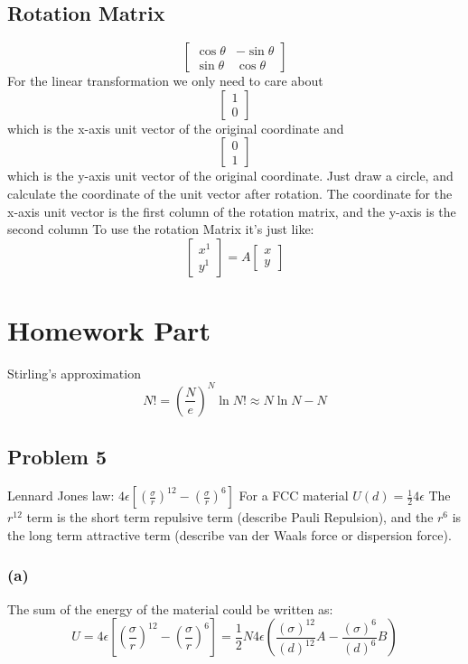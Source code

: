 \documentclass[a4paper]{article}
\begin{document}
\subsection{Rotation Matrix}
$$
\begin{bmatrix}
	{\cos\theta} & {-\sin\theta} \\
	{\sin\theta} & {\cos\theta}
\end{bmatrix}	
$$
For the linear transformation we only need to care about 
$$
\begin{bmatrix}
	1 \\
	0
\end{bmatrix}
$$
which is the x-axis unit vector of the original coordinate and
$$ 
\begin{bmatrix}
	0 \\
	1
\end{bmatrix}
$$
which is the y-axis unit vector of the original coordinate.
Just draw a circle, and calculate the coordinate of the unit vector after rotation. The coordinate for the x-axis unit vector is the first column of the rotation matrix, and the y-axis is the second column
\bigskip
To use the rotation Matrix it's just like:
$$
\begin{bmatrix}
	x^{1}\\
	y^{1}
\end{bmatrix}
=A
\begin{bmatrix}
	x\\
	y
\end{bmatrix}
$$

\bigskip
\section{Homework Part}
Stirling's approximation 
\begin{equation}
	N! = (\frac{N}{e})^{N}
	\ln N! \approx N\ln N- N
\end{equation}
\subsection{Problem 5}
Lennard Jones law: $4 \epsilon [(\frac{\sigma}{r})^{12}-(\frac{\sigma}{r})^{6}]$
For a FCC material $U(d)=\frac{1}{2} 4 \epsilon $
\newline
The $r^{12}$ term is the short term repulsive term (describe Pauli Repulsion), and the $r^{6}$ is the long term attractive term (describe van der Waals force or dispersion force).

\subsubsection{(a)}
The sum of the energy of the material could be written as: 
\begin{equation}
	U=4\epsilon [(\frac{\sigma}{r})^{12}-(\frac{\sigma}{r})^{6}]=\frac{1}{2}N 4\epsilon (\frac{(\sigma)^{12}}{(d)^{12}}A-\frac{(\sigma)^{6}}{(d)^{6}}B)
\end{equation}
\end{document}
